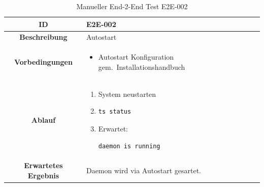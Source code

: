 \documentclass[a4paper,12pt]{report}
\begin{document}
    \clearpage

    \begin{table}[h!]
        \centering
        \setlength{\leftmargini}{0.8cm}
        \begin{tabular}{|c|p{10cm}|}
            \hline
            \textbf{ID}                  & E2E-002                             \\ \hline
            \textbf{Beschreibung}        & Autostart                           \\ \hline
            \textbf{Vorbedingungen} &
            \begin{itemize}
                \item Autostart Konfiguration gem.\ Installationshandbuch
            \end{itemize} \\ \hline
            \textbf{Ablauf} &
            \begin{enumerate}
                \item System neustarten
                \item \begin{verbatim}ts status
                \end{verbatim}
                \item Erwartet: \begin{verbatim}daemon is running
                \end{verbatim}
            \end{enumerate} \\ \hline
            \textbf{Erwartetes Ergebnis} & Daemon wird via Autostart gesartet. \\ \hline
        \end{tabular}
        \caption{Manueller End-2-End Test E2E-002}\label{tab:e2e-2}
    \end{table}
\end{document}
